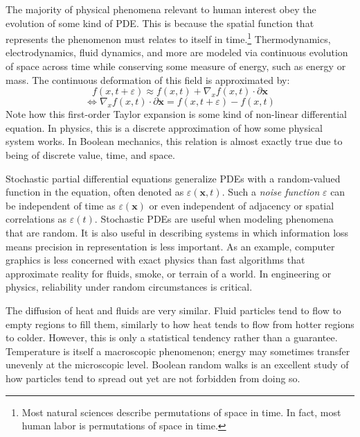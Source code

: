 \documentclass[10pt, a5paper, twoside, openright]{memoir}
\begin{document}
The majority of physical phenomena relevant to human interest obey the evolution of some kind of PDE. This is because the spatial function that represents the phenomenon must relates to itself in time.\footnote{Most natural sciences describe permutations of space in time. In fact, most human labor is permutations of space in time.} Thermodynamics, electrodynamics, fluid dynamics, and more are modeled via continuous evolution of space across time while conserving some measure of energy, such as energy or mass. The continuous deformation of this field is approximated by:
$$f(x, t+ \varepsilon) \approx f(x, t) + \nabla_x f(x,t) \cdot \partial \boldsymbol x$$
$$\iff \nabla_x f(x,t) \cdot \partial \boldsymbol x = f(x, t+ \varepsilon) - f(x, t)$$
Note how this first-order Taylor expansion is some kind of non-linear differential equation. In physics, this is a discrete approximation of how some physical system works. In Boolean mechanics, this relation is almost exactly true due to being of discrete value, time, and space.

Stochastic partial differential equations generalize PDEs with a random-valued function in the equation, often denoted as $\varepsilon (\boldsymbol x,t)$. Such a \textit{noise function} $\varepsilon$ can be independent of time as $\varepsilon(\boldsymbol x)$ or even independent of adjacency or spatial correlations as $\varepsilon( t)$. Stochastic PDEs are useful when modeling phenomena that are random. It is also useful in describing systems in which information loss means precision in representation is less important. As an example, computer graphics is less concerned with exact physics than fast algorithms that approximate reality for fluids, smoke, or terrain of a world. In engineering or physics, reliability under random circumstances is critical.

The diffusion of heat and fluids are very similar. Fluid particles tend to flow to empty regions to fill them, similarly to how heat tends to flow from hotter regions to colder. However, this is only a statistical tendency rather than a guarantee. Temperature is itself a macroscopic phenomenon; energy may sometimes transfer unevenly at the microscopic level. Boolean random walks is an excellent study of how particles tend to spread out yet are not forbidden from doing so.
\end{document}
